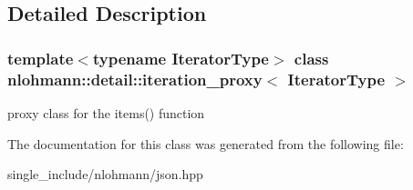 \subsection{Detailed Description}
\subsubsection*{template$<$typename Iterator\+Type$>$\newline
class nlohmann\+::detail\+::iteration\+\_\+proxy$<$ Iterator\+Type $>$}

proxy class for the items() function 

The documentation for this class was generated from the following file\+:\begin{DoxyCompactItemize}
\item 
single\+\_\+include/nlohmann/json.\+hpp\end{DoxyCompactItemize}
